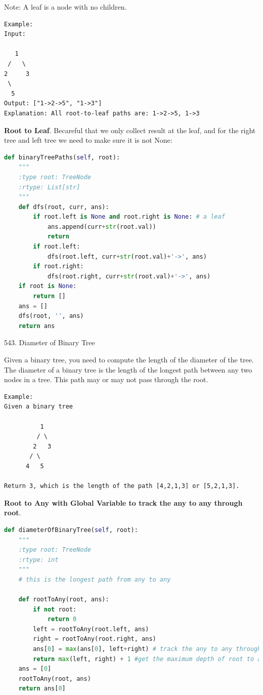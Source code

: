 \documentclass[../main.tex]{subfiles}
\begin{document}
Note: A leaf is a node with no children.
\begin{lstlisting}
Example:
Input:

   1
 /   \
2     3
 \
  5
Output: ["1->2->5", "1->3"]
Explanation: All root-to-leaf paths are: 1->2->5, 1->3
\end{lstlisting}
\textbf{Root to Leaf}. Becareful that we only collect result at the leaf, and for the right tree and left tree we need to make sure it is not None:
\begin{lstlisting}[language=Python]
def binaryTreePaths(self, root):
    """
    :type root: TreeNode
    :rtype: List[str]
    """
    def dfs(root, curr, ans):
        if root.left is None and root.right is None: # a leaf
            ans.append(curr+str(root.val))
            return
        if root.left:
            dfs(root.left, curr+str(root.val)+'->', ans)
        if root.right:
            dfs(root.right, curr+str(root.val)+'->', ans)
    if root is None:
        return []
    ans = []
    dfs(root, '', ans)
    return ans
\end{lstlisting}
543. Diameter of Binary Tree

 Given a binary tree, you need to compute the length of the diameter of the tree. The diameter of a binary tree is the length of the longest path between any two nodes in a tree. This path may or may not pass through the root.
\begin{lstlisting}
Example:
Given a binary tree

          1
         / \
        2   3
       / \     
      4   5    

Return 3, which is the length of the path [4,2,1,3] or [5,2,1,3]. 
\end{lstlisting}
\textbf{Root to Any with Global Variable to track the any to any through root}.
\begin{lstlisting}[language=Python]
def diameterOfBinaryTree(self, root):
    """
    :type root: TreeNode
    :rtype: int
    """
    # this is the longest path from any to any
    
    def rootToAny(root, ans):
        if not root:
            return 0
        left = rootToAny(root.left, ans)
        right = rootToAny(root.right, ans)
        ans[0] = max(ans[0], left+right) # track the any to any through root
        return max(left, right) + 1 #get the maximum depth of root to any
    ans = [0]
    rootToAny(root, ans)
    return ans[0]
\end{lstlisting}
\end{document}
